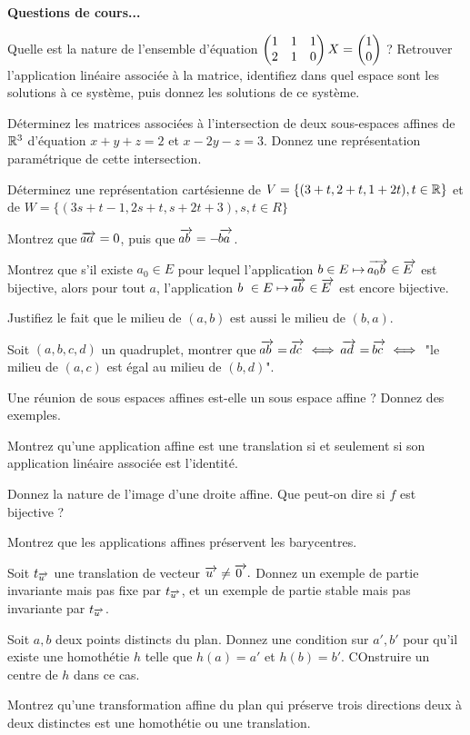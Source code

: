 \be
\textbf{Questions de cours...}
\ben
\item Quelle est la nature de l'ensemble d'équation $\begin{pmatrix}1&1&1\\2&1&0\end{pmatrix}X = \begin{pmatrix}1\\0\end{pmatrix}$ ? Retrouver l'application linéaire associée à la matrice, identifiez dans quel espace sont les solutions à ce système, puis donnez les solutions de ce système.
\item Déterminez les matrices associées à l'intersection de deux sous-espaces affines de $\mathbb{R}^3$ d'équation $x+ y+z = 2$ et $x-2y-z = 3$. Donnez une représentation paramétrique de cette intersection.
\item Déterminez une représentation cartésienne de $V = \{(3+t, 2+t,1+2t), t \in \mathbb{R}\}$ et de $W = \{(3s+t-1, 2s+t, s+2t+3), s,t \in R\}$
\item Montrez que $\overrightarrow{\kern-1ptaa\kern 2pt}=0$, puis que $\overrightarrow{\kern-1ptab\kern 2pt} = - \overrightarrow{\kern-1ptba\kern 2pt}$.
\item Montrez que s'il existe $a_0 \in E$ pour lequel l'application $b \in E \mapsto \overrightarrow{\kern-1pta_0b\kern 2pt} \in \overrightarrow{\kern-1ptE\kern 2pt}$ est bijective, alors pour tout $a$, l'application $b \in E  \mapsto \vect{ab} \in \vect{E}$ est encore bijective.
\item Justifiez le fait que le milieu de $(a,b)$ est aussi le milieu de $(b,a)$.
\item Soit $(a,b,c,d)$ un quadruplet, montrer que $\overrightarrow{\kern-1ptab\kern 2pt} = \overrightarrow{\kern-1ptdc\kern 2pt} \iff \overrightarrow{\kern-1ptad\kern 2pt} = \overrightarrow{\kern-1ptbc\kern 2pt} \iff$ "le milieu de $(a,c)$ est égal au milieu de $(b,d)$".
\item Une réunion de sous espaces affines est-elle un sous espace affine ? Donnez des exemples.
\item Montrez qu'une application affine est une translation si et seulement si son application linéaire associée est l'identité.
\item Donnez la nature de l'image d'une droite affine. Que peut-on dire si $f$ est bijective ?
\item Montrez que les applications affines préservent les barycentres.
\item Soit $t_{\overrightarrow{\kern-1ptu\kern 2pt}}$ une translation de vecteur $\overrightarrow{\kern-1ptu\kern 2pt} \ne \overrightarrow{\kern-1pt0\kern 2pt}.$ Donnez un exemple de partie invariante mais pas fixe par $t_{\overrightarrow{\kern-1ptu\kern 2pt}}$, et un exemple de partie stable mais pas invariante par $t_{\overrightarrow{\kern-1ptu\kern 2pt}}$.
\item Soit $a,b$ deux points distincts du plan. Donnez une condition sur $a',b'$ pour qu'il existe une homothétie $h$ telle que $h(a) = a'$ et $h(b) = b'$. COnstruire un centre de $h$ dans ce cas.
\item Montrez qu'une transformation affine du plan qui préserve trois directions deux à deux distinctes est une homothétie ou une translation.
